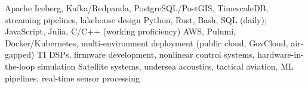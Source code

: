 \begin{enumerate}
     Apache Iceberg, Kafka/Redpanda,
    PostgreSQL/PostGIS, TimescaleDB, streaming pipelines, lakehouse design
     Python, Rust, Bash, SQL (daily);
    JavaScript, Julia, C/C++ (working proficiency)
     AWS, Pulumi, Docker/Kubernetes,
    multi-environment deployment (public cloud, GovCloud, air-gapped)
     TI DSPs, firmware development,
    nonlinear control systems, hardware-in-the-loop simulation
     Satellite systems, undersea acoustics, tactical
    aviation, ML pipelines, real-time sensor processing
\end{enumerate}
